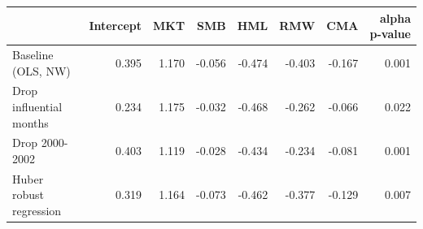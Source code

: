 \begin{tabular}{lrrrrrrr}
\toprule
 & Intercept & MKT & SMB & HML & RMW & CMA & alpha p-value \\
\midrule
Baseline (OLS, NW) & 0.395 & 1.170 & -0.056 & -0.474 & -0.403 & -0.167 & 0.001 \\
Drop influential months & 0.234 & 1.175 & -0.032 & -0.468 & -0.262 & -0.066 & 0.022 \\
Drop 2000-2002 & 0.403 & 1.119 & -0.028 & -0.434 & -0.234 & -0.081 & 0.001 \\
Huber robust regression & 0.319 & 1.164 & -0.073 & -0.462 & -0.377 & -0.129 & 0.007 \\
\bottomrule
\end{tabular}
